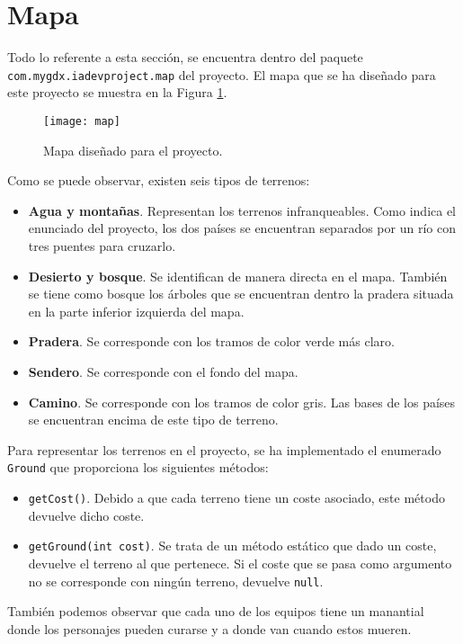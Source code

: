 \medskip
\section{Mapa}
Todo lo referente a esta sección, se encuentra dentro del paquete \texttt{com.mygdx.iadevproject.map} del proyecto. El mapa que se ha diseñado para este proyecto se muestra en la Figura \ref{mapa:mapa}.
\begin{figure}[!th]
\texttt{[image: map]}
\centering
\caption{Mapa diseñado para el proyecto.}
\label{mapa:mapa}
\end{figure}

Como se puede observar, existen seis tipos de terrenos:
\begin{itemize}
 \item \textbf{Agua y montañas}. Representan los terrenos infranqueables. Como indica el enunciado del proyecto, los dos países se encuentran separados por un río con tres puentes para cruzarlo.
 \item \textbf{Desierto y bosque}. Se identifican de manera directa en el mapa. También se tiene como bosque los árboles que se encuentran dentro la pradera situada en la parte inferior izquierda del mapa.
 \item \textbf{Pradera}. Se corresponde con los tramos de color verde más claro.
 \item \textbf{Sendero}. Se corresponde con el fondo del mapa.
 \item \textbf{Camino}. Se corresponde con los tramos de color gris. Las bases de los países se encuentran encima de este tipo de terreno.
\end{itemize}

Para representar los terrenos en el proyecto, se ha implementado el enumerado \texttt{Ground} que proporciona los siguientes métodos:
\begin{itemize}
 \item \texttt{getCost()}. Debido a que cada terreno tiene un coste asociado, este método devuelve dicho coste.
 \item \texttt{getGround(int cost)}. Se trata de un método estático que dado un coste, devuelve el terreno al que pertenece. Si el coste que se pasa como argumento no se corresponde con ningún terreno, devuelve \texttt{null}.
\end{itemize}

También podemos observar que cada uno de los equipos tiene un manantial donde los personajes pueden curarse y a donde van cuando estos mueren. \\

